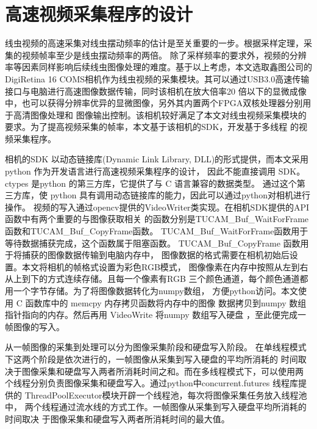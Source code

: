 \section{高速视频采集程序的设计}
	线虫视频的高速采集对线虫摆动频率的估计是至关重要的一步。根据采样定理，采集的视频帧率至少是线虫摆动频率的两倍。
	除了采样频率的要求外，视频的分辨率等因素同样影响后续线虫图像处理的难度。基于以上考虑，本文选取鑫图公司的DigiRetina 16
	 COMS相机作为线虫视频的采集模块。其可以通过USB3.0高速传输接口与电脑进行高速图像数据传输，同时该相机在放大倍率20
	 倍以下的显微成像中，也可以获得分辨率优异的显微图像，另外其内置两个FPGA双核处理器分别用于高清图像处理和
	 图像输出控制。该相机较好满足了本文对线虫视频采集模块的要求。为了提高视频采集的帧率，本文基于该相机的SDK，开发基于多线程
	 的视频采集程序。
	 
	相机的SDK 以动态链接库(Dynamic Link Library, DLL)的形式提供，而本文采用 python 作为开发语言进行高速视频采集程序的设计，
	因此不能直接调用 SDK。ctypes 是python 的第三方库，它提供了与 C 语言兼容的数据类型。
	通过这个第三方库，使 python 具有调用动态链接库的能力，因此可以通过python对相机进行操作。
	视频的写入通过opencv提供的VideoWriter类实现。在相机SDK提供的API函数中有两个重要的与图像获取相关
	的函数分别是TUCAM\_Buf\_WaitForFrame 函数和TUCAM\_Buf\_CopyFrame函数。
	TUCAM\_Buf\_WaitForFrame函数用于等待数据捕获完成，这个函数属于阻塞函数。
	TUCAM\_Buf\_CopyFrame 函数用于将捕获的图像数据传输到电脑内存中，
	图像数据的格式需要在相机初始后设置。本文将相机的帧格式设置为彩色RGB模式，
	图像像素在内存中按照从左到右从上到下的方式连续存储。且每一个像素有RGB
	三个颜色通道，每个颜色通道都用一个字节存储。为了将图像数据转化为numpy数组，
	方便python访问。本文使用 C 函数库中的 memcpy 内存拷贝函数将内存中的图像
	数据拷贝到numpy 数组指针指向的内存。然后再用 VideoWrite 将numpy 数组写入硬盘
	，至此便完成一帧图像的写入。
	
	从一帧图像的采集到处理可以分为图像采集阶段和硬盘写入阶段。
	在单线程模式下这两个阶段是依次进行的，一帧图像从采集到写入硬盘的平均所消耗的
	时间取决于图像采集和硬盘写入两者所消耗时间之和。而在多线程模式下，可以使用两
	个线程分别负责图像采集和硬盘写入。通过python中concurrent.futures 线程库提供的
	ThreadPoolExecutor模块开辟一个线程池，每次将图像采集任务放入线程池中，
	两个线程通过流水线的方式工作。一帧图像从采集到写入硬盘平均所消耗的时间取决
	于图像采集和硬盘写入两者所消耗时间的最大值。
	
